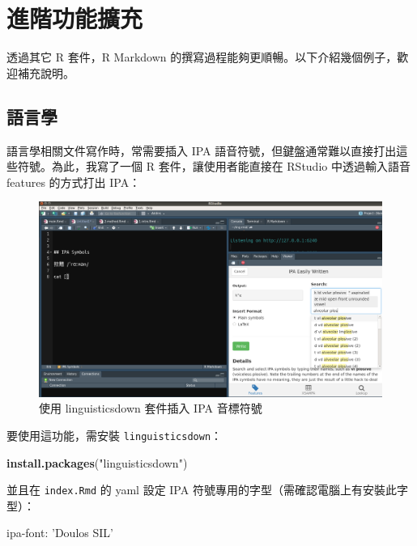 \documentclass[oneside]{book}
\newenvironment{Shaded}{\begin{snugshade}}{\end{snugshade}}
\newcommand{\KeywordTok}[1]{\textcolor[rgb]{0.13,0.29,0.53}{\textbf{#1}}}
\newcommand{\StringTok}[1]{\textcolor[rgb]{0.31,0.60,0.02}{#1}}
\newcommand{\FunctionTok}[1]{\textcolor[rgb]{0.00,0.00,0.00}{#1}}
\newcommand{\AttributeTok}[1]{\textcolor[rgb]{0.77,0.63,0.00}{#1}}
\newcommand{\NormalTok}[1]{#1}
\theoremstyle{definition}
\theoremstyle{definition}
\theoremstyle{definition}
\theoremstyle{remark}
\begin{document}
\chapter{進階功能擴充}\label{add-on}

透過其它 R 套件，R Markdown
的撰寫過程能夠更順暢。以下介紹幾個例子，歡迎補充說明。

\section{語言學}\label{ling}

語言學相關文件寫作時，常需要插入 IPA
語音符號，但鍵盤通常難以直接打出這些符號。為此，我寫了一個 R
套件，讓使用者能直接在 RStudio 中透過輸入語音 features 的方式打出 IPA：

\begin{figure}[H]

{\centering \includegraphics[width=1\linewidth]{figs/ipa} 

}

\caption{使用 linguisticsdown 套件插入 IPA 音標符號}\label{fig:unnamed-chunk-9}
\end{figure}

要使用這功能，需安裝 \texttt{linguisticsdown}：

\begin{Shaded}
\begin{Highlighting}[]
\KeywordTok{install.packages}\NormalTok{(}\StringTok{"linguisticsdown"}\NormalTok{)}
\end{Highlighting}
\end{Shaded}

並且在 \texttt{index.Rmd} 的 yaml 設定 IPA
符號專用的字型（需確認電腦上有安裝此字型）：

\begin{Shaded}
\begin{Highlighting}[]
\FunctionTok{ipa-font:}\AttributeTok{ }\StringTok{'Doulos SIL'}
\end{Highlighting}
\end{Shaded}
\end{document}
